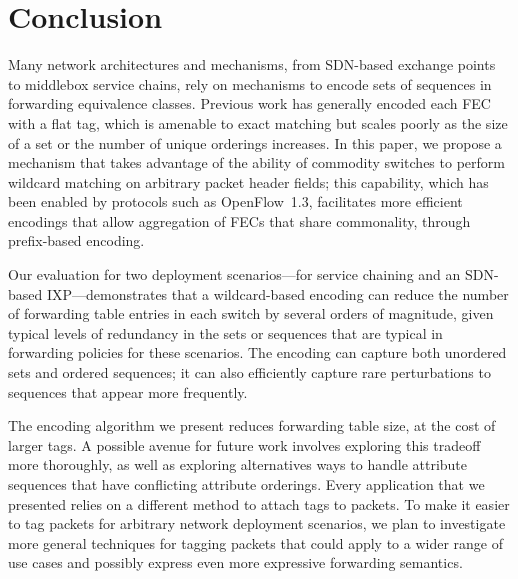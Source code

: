 \section{Conclusion} \label{sec:conclusion}

Many network architectures and mechanisms, from SDN-based exchange
points to middlebox service chains, rely on mechanisms to encode sets of
sequences in forwarding equivalence classes. Previous work has generally
encoded each FEC with a flat tag, which is amenable to exact matching
but scales poorly as the size of a set or the number of unique orderings
increases. In this paper, we propose a mechanism that takes advantage of
the ability of commodity switches to perform wildcard matching
on arbitrary packet header fields; this capability, which has been
enabled by protocols such as OpenFlow~1.3, facilitates more efficient
encodings that allow aggregation of FECs that share commonality, through
prefix-based encoding. 

Our evaluation for two deployment scenarios---for service chaining and
an SDN-based IXP---demonstrates that a wildcard-based encoding can
reduce the number of forwarding table entries in each switch by several
orders of magnitude, given typical levels of redundancy in the sets or
sequences that are typical in forwarding policies for these
scenarios. The encoding can capture both unordered sets and ordered
sequences; it can also efficiently capture rare perturbations to
sequences that appear more frequently.


The encoding algorithm we present reduces forwarding table size, at the
cost of larger tags. A possible avenue for future work involves
exploring this tradeoff more thoroughly, as well as exploring
alternatives ways to handle attribute sequences that have conflicting
attribute orderings.  Every application that we presented relies on a
different method to attach tags to packets. To make it easier to tag
packets for arbitrary network deployment scenarios, we plan to
investigate more general techniques for tagging packets that could apply
to a wider range of use cases and possibly express even more expressive
forwarding semantics. 